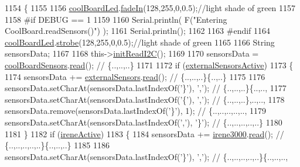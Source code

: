 \begin{DoxyCode}
1154 \{
1155 
1156     \hyperlink{class_cool_board_a1b1d3c684a5baa56b08486e192fd8e97}{coolBoardLed}.\hyperlink{class_cool_board_led_ab778f5e7bed0ab74e3906d82110493c3}{fadeIn}(128,255,0,0.5);\textcolor{comment}{//light shade of green}
1157                 
1158 \textcolor{preprocessor}{#if DEBUG == 1}
1159 
1160     Serial.println( F(\textcolor{stringliteral}{"Entering CoolBoard.readSensors()"}) );
1161     Serial.println();
1162 
1163 \textcolor{preprocessor}{#endif}
1164     \hyperlink{class_cool_board_a1b1d3c684a5baa56b08486e192fd8e97}{coolBoardLed}.\hyperlink{class_cool_board_led_ad5f0de4c628cbfbf49896042831c64ad}{strobe}(128,255,0,0.5);\textcolor{comment}{//light shade of green}
1165 
1166     String sensorsData;
1167     
1168     this->\hyperlink{class_cool_board_a397b46fadab8f530a8cf4d914c561366}{initReadI2C}();
1169 
1170     sensorsData = \hyperlink{class_cool_board_af102be5288bd7f7a8e59b13f86e26a00}{coolBoardSensors}.\hyperlink{class_cool_board_sensors_a91badb2539d91fda8679f2a597874c48}{read}(); \textcolor{comment}{// \{..,..,..\}}
1171     
1172     \textcolor{keywordflow}{if} (\hyperlink{class_cool_board_a638b00b76aeb819ecfd4c10b8cdd7bb7}{externalSensorsActive})
1173     \{
1174         sensorsData += \hyperlink{class_cool_board_a09e26264839c65873eb56af476eff6b2}{externalSensors}.\hyperlink{class_external_sensors_a53177b81eca3be89508b5511ddcd00fc}{read}(); \textcolor{comment}{// \{..,..,..\}\{..,..\}}
1175 
1176         sensorsData.setCharAt(sensorsData.lastIndexOf(\textcolor{charliteral}{'\}'}), \textcolor{charliteral}{','}); \textcolor{comment}{// \{..,..,..\}\{..,..,}
1177         sensorsData.setCharAt(sensorsData.lastIndexOf(\textcolor{charliteral}{'\{'}), \textcolor{charliteral}{','}); \textcolor{comment}{// \{..,..,..\},..,..,}
1178         sensorsData.remove(sensorsData.lastIndexOf(\textcolor{charliteral}{'\}'}), 1); \textcolor{comment}{// \{..,..,..,..,..,}
1179         sensorsData.setCharAt(sensorsData.lastIndexOf(\textcolor{charliteral}{','}), \textcolor{charliteral}{'\}'}); \textcolor{comment}{// \{..,..,..,..,..\}}
1180 
1181     \}
1182     \textcolor{keywordflow}{if} (\hyperlink{class_cool_board_a9c3f7ac625481ee2ae802a25d97a4ae0}{ireneActive})
1183     \{
1184         sensorsData += \hyperlink{class_cool_board_ad103718ce316006c4695b8eb312eaf11}{irene3000}.\hyperlink{class_irene3000_a852a170feea994ea1df01c6b245b5d9a}{read}(); \textcolor{comment}{// \{..,..,..,..,..\}\{..,..,..\}}
1185 
1186         sensorsData.setCharAt(sensorsData.lastIndexOf(\textcolor{charliteral}{'\}'}), \textcolor{charliteral}{','}); \textcolor{comment}{// \{..,..,..,..,..\}\{..,..,..,}

\end{DoxyCode}
